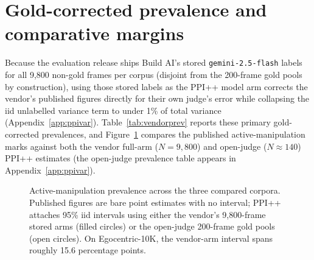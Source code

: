 \documentclass[11pt]{article}
\begin{document}
\begin{table}[t]
\centering\footnotesize

\caption{Error-direction sensitivity across the first 93 labels (10\,s/frame median), all
\vernierNPrimary{} labels, and excluding labels recorded in $\leq 2$\,s ($n=129$), for both the
vendor's stored labels and the open judge.}
\label{tab:sens}
\end{table}

\section{Gold-corrected prevalence and comparative margins}
\label{sec:prevalence}

Because the evaluation release ships Build AI's stored \texttt{gemini-2.5-flash} labels for all
9{,}800 non-gold frames per corpus (disjoint from the 200-frame gold pools by construction),
using those stored labels as the PPI++ model arm corrects the vendor's published figures directly
for their own judge's error while collapsing the iid unlabelled variance term to under 1\% of
total variance (Appendix~\ref{app:ppivar}). Table~\ref{tab:vendorprev} reports these primary
gold-corrected prevalences, and Figure~\ref{fig:forest} compares the published active-manipulation
marks against both the vendor full-arm ($N = 9{,}800$) and open-judge ($N \approx 140$) PPI++
estimates (the open-judge prevalence table appears in Appendix~\ref{app:ppivar}).

\begin{table}[t]
\centering\footnotesize

\caption{Gold-corrected prevalence via PPI++ using the vendor's own stored
\texttt{gemini-2.5-flash} labels over the full $N = 9{,}800$ unlabelled evaluation arms per
corpus. Intervals are iid lower bounds on width because evaluation frames carry no cluster
identifier.}
\label{tab:vendorprev}
\end{table}

\begin{figure}[t]
\centering

\caption{Active-manipulation prevalence across the three compared corpora. Published figures are
bare point estimates with no interval; PPI++ attaches 95\% iid intervals using either the vendor's
9{,}800-frame stored arms (filled circles) or the open-judge 200-frame gold pools (open circles).
On Egocentric-10K, the vendor-arm interval spans roughly 15.6 percentage points.}
\label{fig:forest}
\end{figure}
\end{document}
